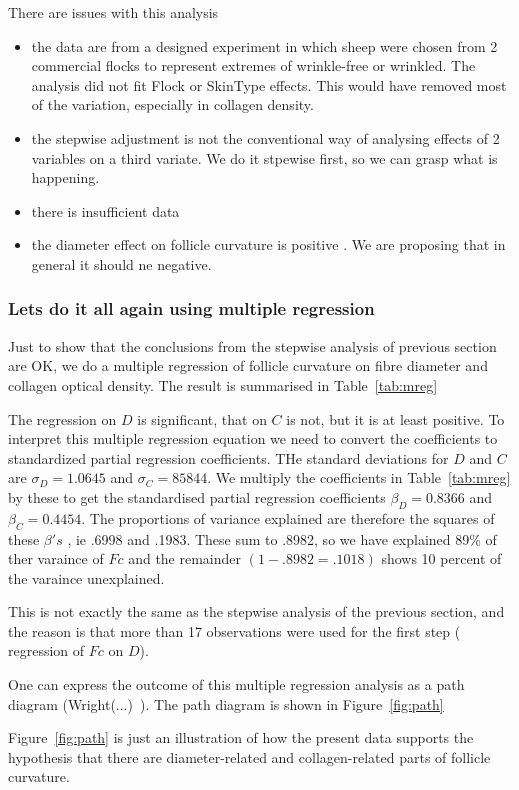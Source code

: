 \documentclass{article}
\begin{document}
There are issues with this analysis
\begin{itemize}
\item the data are from a designed experiment in which sheep were chosen from 2 commercial flocks to represent extremes of wrinkle-free or wrinkled. The analysis did not fit Flock or SkinType effects. This would have removed most of the variation, especially in collagen density. 
\item the stepwise adjustment is not the conventional way of analysing effects of 2 variables on a third variate.  We do it stpewise first, so we can grasp what is happening. 
\item there is insufficient data
\item the diameter effect on follicle curvature is positive . We are proposing that in general it should ne negative.
\end{itemize}

\subsubsection{ Lets do it all again using multiple regression}
Just to show that the conclusions from the stepwise analysis of previous section are OK, we do a multiple regression of follicle curvature  on fibre diameter and collagen optical density. The result is summarised in Table~\ref{tab:mreg}

The regression on $D$ is significant, that on $C$ is not, but it is at least positive. To interpret this multiple regression equation we need to convert the coefficients to standardized partial regression coefficients. THe standard deviations for $D$ and $C$ are $\sigma_{D} = 1.0645$ and $\sigma_{C} = 85844$. We multiply the coefficients in Table~\ref{tab:mreg} by these to get the standardised partial regression coefficients $\beta_{D} = 0.8366$ and $\beta_{C} = 0.4454$. The proportions of variance explained are therefore the squares of these $\beta's$ , ie .6998 and .1983. These sum to .8982, so we have explained 89\% of ther varaince of $Fc$ and the remainder $(1-.8982 = .1018)$ shows 10 percent of the varaince unexplained.

This is not exactly the same as the stepwise analysis of the previous section, and the reason is that more than 17 observations were used for the first step ( regression of $Fc$ on $D$). 

One can express the outcome of this multiple regression analysis as a path diagram (Wright(...)~\cite{wright-}). The path diagram is shown in Figure~\ref{fig:path}

Figure~\ref{fig:path} is just an illustration of how the present data supports the hypothesis that there are diameter-related and collagen-related parts of follicle curvature. 
\end{document}
